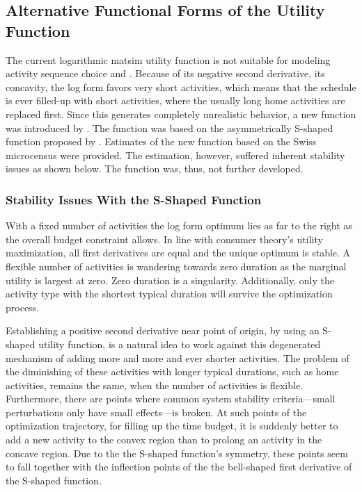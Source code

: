 \subsection{Alternative Functional Forms of the Utility Function}
\label{sec:alternative-functions}
The current logarithmic \gls{matsim} utility function is not suitable for modeling activity sequence choice \citet[][p.127f]{Feil_PhDThesis_2010} and \citet[][]{MATSim_Userguide_2015}. Because of its negative second derivative, \ie its concavity, the log form favors very short activities, which means that the schedule is ever filled-up with short activities, where the usually long home activities are replaced first. Since this generates completely unrealistic behavior, a new function was introduced by \citet[][p.129ff]{Feil_PhDThesis_2010}. The function was based on the asymmetrically S-shaped function proposed by \citet[][]{Joh_PhDThesis_2004}. Estimates of the new function based on the Swiss microcensus were provided. The estimation, however, suffered inherent stability issues as shown below. The function was, thus, not further developed.

\subsubsection{Stability Issues With the S-Shaped Function}
With a fixed number of activities the log form optimum lies as far to the right as the overall budget constraint allows. 
In line with consumer theory's utility maximization, all first derivatives are equal and the unique optimum is stable.
A flexible number of activities is wandering towards zero duration as the marginal utility is largest at zero. 
Zero duration is a singularity. 
Additionally, only the activity type with the shortest typical duration will survive the optimization process.

Establishing a positive second derivative near point of origin, by using an S-shaped utility function, is a natural idea to work against this degenerated mechanism of adding more and more and ever shorter activities.
The problem of the diminishing of these activities with longer typical durations, such as home activities, remains the same, when the number of activities is flexible.
Furthermore, there are points where common system stability criteria---small perturbations only have small effects---is broken.
At such points of the optimization trajectory, for filling up the time budget, it is suddenly better to add a new activity to the convex region than to prolong an activity in the concave region.
Due to the the S-shaped function's symmetry, these points seem to fall together with the inflection points of the the bell-shaped first derivative of the S-shaped function.

